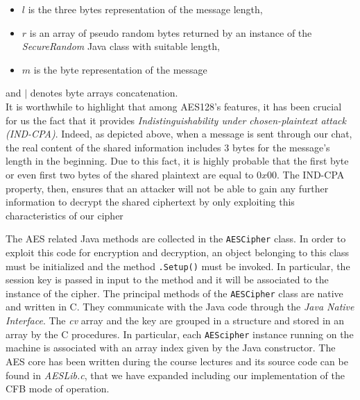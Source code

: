 \documentclass[12pt]{article}
\begin{document}
\begin{itemize}
    \item $l$ is the three bytes representation of the message length,
    \item $r$ is an array of pseudo random bytes returned by an instance of the {\em SecureRandom} Java class with suitable length,
    \item  $m$ is the byte representation of the message 
\end{itemize} 
and $|$ denotes byte arrays concatenation.\\
It is worthwhile to highlight that among AES128's features, it has been crucial for us the fact that it provides {\em Indistinguishability under chosen-plaintext attack (IND-CPA)}. Indeed, as depicted above, when a message is sent through our chat, the real content of the shared information includes 3 bytes for the message's length in the beginning. Due to this fact, it is highly probable that the first byte or even first two bytes of the shared plaintext are equal to $0x00$. The IND-CPA property, then, ensures that an attacker will not be able to gain any further information to decrypt the shared ciphertext by only exploiting this characteristics of our cipher \bigskip

\noindent The AES related Java methods are collected in the \texttt{AESCipher} class. In order to exploit this code for encryption and decryption, an object belonging to this class must be initialized and the method \texttt{.Setup()} must be invoked. In particular, the session key is passed in input to the method and it will be associated to the instance of the cipher. The principal methods of the \texttt{AESCipher} class are native and written in C. They communicate with the Java code through the {\em Java Native Interface}. The {\em cv} array and the key are grouped in a structure and stored in an array by the C procedures. In particular, each \texttt{AEScipher} instance running on the machine is associated with an array index given by the Java constructor. The AES core has been written during the course lectures and its source code can be found in {\em AESLib.c}, that we have expanded including our implementation of the CFB mode of operation.
\end{document}
